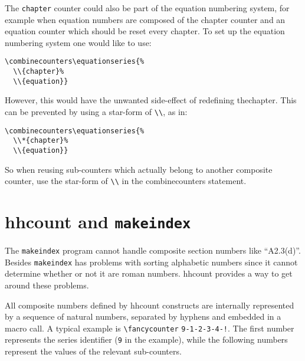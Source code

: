\documentclass[11pt]{article}
\makeatletter
\def\packagename#1{{\sffamily #1}}     %
\def\macroname#1{{\ttfamily\@ttbs#1}}  %
\def\hhcount{\packagename{hhcount}\xspace}
\def\={\verb=}
\def\<#1>{\macroname{#1}}
\makeatother
\begin{document}
The \texttt{chapter} counter could also be part of the equation numbering
system, for example when equation numbers are composed of the chapter
counter and an equation counter which should be reset every chapter.
To set up the equation numbering system one would like to use:
\begin{verbatim}
\combinecounters\equationseries{%
  \\{chapter}%
  \\{equation}}
\end{verbatim}
However, this would have the unwanted side-effect of redefining
\<thechapter>. This can be prevented by using a star-form of \=\\=,
as in:
\begin{verbatim}
\combinecounters\equationseries{%
  \\*{chapter}%
  \\{equation}}
\end{verbatim}
So when reusing sub-counters which actually belong to another
composite counter, use the star-form of \=\\= in the \<combinecounters>
statement.

\section{\hhcount and \texttt{makeindex}}

The {\tt makeindex} program cannot handle
composite section numbers like ``A2.3(d)''.
Besides {\tt makeindex} has problems
with sorting alphabetic numbers since it cannot determine whether
or not it are roman numbers. \hhcount provides a way to get around
these problems.

All composite numbers defined by \hhcount constructs
are internally represented by a sequence of natural numbers, separated
by hyphens and embedded in a macro call. A typical example is
\=\fancycounter= \=9-1-2-3-4-!=. The first number represents the
series identifier (\=9= in the example), while the following
numbers represent the values of the relevant sub-counters.
\end{document}
